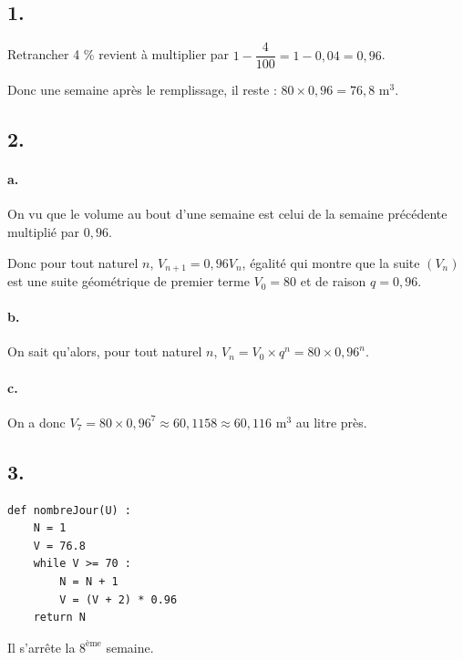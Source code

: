 \subsection*{1.}

Retrancher 4 \% revient à multiplier par \(1 - \dfrac{4}{100} = 1 - 0{,}04 = 0{,}96\).

Donc une semaine après le remplissage, il reste : \(80 \times 0{,}96 = 76{,}8 \text{ m}^3\).

\subsection*{2.}

\paragraph{a.} On vu que le volume au bout d'une semaine est celui de la semaine précédente multiplié par \(0{,}96\).

Donc pour tout naturel \(n\), \(V_{n+1} = 0{,}96V_n\), égalité qui montre que la suite \((V_n)\) est une suite géométrique de premier terme \(V_0 = 80\) et de raison \(q = 0{,}96\).

\paragraph{b.} On sait qu'alors, pour tout naturel \(n\), \(V_n = V_0 \times q^n = 80 \times 0{,}96^n\).

\paragraph{c.} On a donc \(V_7 = 80 \times 0{,}96^7 \approx 60{,}1158 \approx 60{,}116\) m\(^3\) au litre près.

\subsection*{3.}

\begin{center}
\begin{lstlisting}[style=python]
def nombreJour(U) :
    N = 1
    V = 76.8
    while V >= 70 :
        N = N + 1
        V = (V + 2) * 0.96
    return N
\end{lstlisting}
\end{center}

Il s'arrête la \(8^{\text{ème}}\) semaine.
